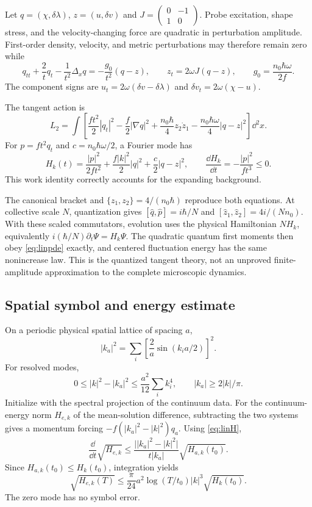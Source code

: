\documentclass[11pt]{article}
\begin{document}
Let $q=(\chi,\delta\lambda)$, $z=(u,\delta v)$ and
$J=\begin{pmatrix}0&-1\\1&0\end{pmatrix}$.
Probe excitation, shape stress, and the velocity-changing force are quadratic in perturbation amplitude. First-order density, velocity, and metric perturbations may therefore remain zero while
\begin{equation}\label{eq:linpde}
\boxed{q_{tt}+\frac2tq_t-\frac1{t^2}\Delta_xq
=-\frac{g_0}{t^2}(q-z),\qquad
z_t=2\omega J(q-z),\qquad
g_0=\frac{n_0\hbar\omega}{2f}.}
\end{equation}
The component signs are $u_t=2\omega(\delta v-\delta\lambda)$ and
$\delta v_t=2\omega(\chi-u)$.

The tangent action is
\[
L_2=\int\left[
\frac{ft^2}{2}|q_t|^2-\frac f2|\nabla q|^2
+\frac{n_0\hbar}{4}z_2\dot z_1
-\frac{n_0\hbar\omega}{4}|q-z|^2\right]\dd^2x.
\]
For $p=ft^2q_t$ and $c=n_0\hbar\omega/2$, a Fourier mode has
\begin{equation}\label{eq:linH}
H_k(t)=\frac{|p|^2}{2ft^2}+\frac{f|k|^2}{2}|q|^2
+\frac c2|q-z|^2,\qquad
\frac{\dd H_k}{\dd t}=-\frac{|p|^2}{ft^3}\le0.
\end{equation}
This work identity correctly accounts for the expanding background.

The canonical bracket and $\{z_1,z_2\}=4/(n_0\hbar)$ reproduce both equations. At collective scale $N$, quantization gives
$[\widehat q,\widehat p]=i\hbar/N$ and
$[\widehat z_1,\widehat z_2]=4i/(Nn_0)$.
With these scaled commutators, evolution uses the physical Hamiltonian $NH_k$, equivalently $i(\hbar/N)\partial_t\Psi=H_k\Psi$. The quadratic quantum first moments then obey \eqref{eq:linpde} exactly, and centered fluctuation energy has the same nonincrease law. This is the quantized tangent theory, not an unproved finite-amplitude approximation to the complete microscopic dynamics.

\subsection{Spatial symbol and energy estimate}
On a periodic physical spatial lattice of spacing $a$,
\[
|k_a|^2=\sum_i\left[\frac2a\sin(k_i a/2)\right]^2.
\]
For resolved modes,
\[
0\le|k|^2-|k_a|^2\le\frac{a^2}{12}\sum_i k_i^4,
\qquad |k_a|\ge2|k|/\pi.
\]
Initialize with the spectral projection of the continuum data. For the continuum-energy norm $H_{e,k}$ of the mean-solution difference, subtracting the two systems gives a momentum forcing
$-f(|k_a|^2-|k|^2)q_a$. Using \eqref{eq:linH},
\[
\frac{\dd}{\dd t}\sqrt{H_{e,k}}
\le\frac{\big||k_a|^2-|k|^2\big|}{t|k_a|}
\sqrt{H_{a,k}(t_0)}.
\]
Since $H_{a,k}(t_0)\le H_k(t_0)$, integration yields
\begin{equation}\label{eq:mode}
\sqrt{H_{e,k}(T)}
\le\frac{\pi}{24}a^2\log(T/t_0)|k|^3\sqrt{H_k(t_0)}.
\end{equation}
The zero mode has no symbol error.
\end{document}
